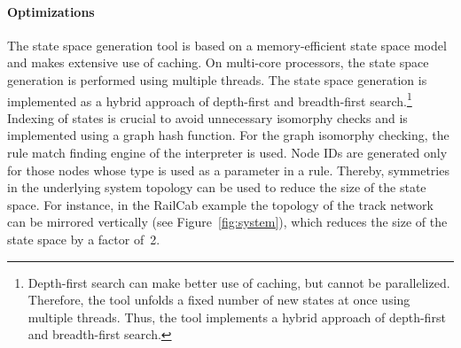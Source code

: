 \halflineup\paragraph{Optimizations}
The state space generation tool is based on a memory-efficient state space model and makes extensive use of caching. On multi-core processors, the state space generation is performed using multiple threads. The state space generation is implemented as a hybrid approach of depth-first and breadth-first search.\footnote{Depth-first search can make better use of caching, but cannot be parallelized. Therefore, the tool unfolds a fixed number of new states at once using multiple threads. Thus, the tool implements a hybrid approach of depth-first and breadth-first search.} Indexing of states is crucial to avoid unnecessary isomorphy checks and is implemented using a graph hash function. For the graph isomorphy checking, the rule match finding engine of the \henshin interpreter is used. Node IDs are generated only for those nodes whose type is used as a parameter in a rule. Thereby, symmetries in the underlying system topology can be used to reduce the size of the state space. For instance, in the RailCab example the topology of the track network can be mirrored vertically (see Figure~\ref{fig:system}), which reduces the size of the state space by a factor of~2.
